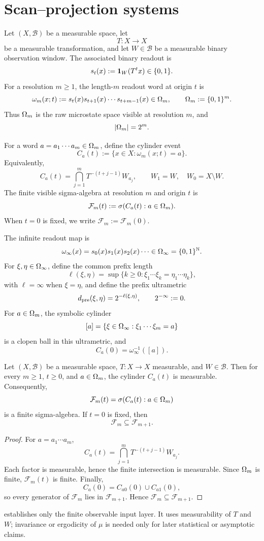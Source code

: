 \section{Scan--projection systems}
\label{sec:scan-projection}

Let \((X,\mathcal B)\) be a measurable space, let
\[
T:X\to X
\]
be a measurable transformation, and let \(W\in\mathcal B\) be a measurable binary observation window.  The associated binary readout is
\[
s_t(x):=\mathbf{1}_W(T^t x)\in\{0,1\}.
\]
For a resolution \(m\ge1\), the length-\(m\) readout word at origin \(t\) is
\[
\omega_m(x;t):=
s_t(x)s_{t+1}(x)\cdots s_{t+m-1}(x)\in\Omega_m,
\qquad
\Omega_m:=\{0,1\}^m.
\]
Thus \(\Omega_m\) is the raw microstate space visible at resolution \(m\), and
\[
|\Omega_m|=2^m.
\]

For a word \(a=a_1\cdots a_m\in\Omega_m\), define the cylinder event
\[
C_a(t):=\{x\in X:\omega_m(x;t)=a\}.
\]
Equivalently,
\[
C_a(t)=\bigcap_{j=1}^{m}T^{-(t+j-1)}W_{a_j},
\qquad
W_1=W,\quad W_0=X\setminus W.
\]
The finite visible sigma-algebra at resolution \(m\) and origin \(t\) is
\[
\mathcal F_m(t):=\sigma(C_a(t):a\in\Omega_m).
\]
When \(t=0\) is fixed, we write \(\mathcal F_m:=\mathcal F_m(0)\).

The infinite readout map is
\[
\omega_\infty(x)=s_0(x)s_1(x)s_2(x)\cdots\in\Omega_\infty=\{0,1\}^{\mathbb{N}}.
\]
For \(\xi,\eta\in\Omega_\infty\), define the common prefix length
\[
\ell(\xi,\eta)=\sup\{k\ge0:\xi_1\cdots\xi_k=\eta_1\cdots\eta_k\},
\]
with \(\ell=\infty\) when \(\xi=\eta\), and define the prefix ultrametric
\[
d_{\rm pre}(\xi,\eta)=2^{-\ell(\xi,\eta)},
\qquad 2^{-\infty}:=0.
\]
For \(a\in\Omega_m\), the symbolic cylinder
\[
[a]=\{\xi\in\Omega_\infty:\xi_1\cdots\xi_m=a\}
\]
is a clopen ball in this ultrametric, and
\[
C_a(0)=\omega_\infty^{-1}([a]).
\]

\begin{theorem}
\label{thm:scan-projection-interface}
Let \((X,\mathcal B)\) be a measurable space, \(T:X\to X\) measurable, and \(W\in\mathcal B\).  Then for every \(m\ge1\), \(t\ge0\), and \(a\in\Omega_m\), the cylinder \(C_a(t)\) is measurable.  Consequently,
\[
\mathcal F_m(t)=\sigma(C_a(t):a\in\Omega_m)
\]
is a finite sigma-algebra.  If \(t=0\) is fixed, then
\[
\mathcal F_m\subseteq\mathcal F_{m+1}.
\]
\end{theorem}

\begin{proof}
For \(a=a_1\cdots a_m\),
\[
C_a(t)=\bigcap_{j=1}^{m}T^{-(t+j-1)}W_{a_j}.
\]
Each factor is measurable, hence the finite intersection is measurable.  Since \(\Omega_m\) is finite, \(\mathcal F_m(t)\) is finite.  Finally,
\[
C_a(0)=C_{a0}(0)\cup C_{a1}(0),
\]
so every generator of \(\mathcal F_m\) lies in \(\mathcal F_{m+1}\).  Hence \(\mathcal F_m\subseteq\mathcal F_{m+1}\).
\end{proof}

\begin{remark}
 establishes only the finite observable input layer.  It uses measurability of \(T\) and \(W\); invariance or ergodicity of \(\mu\) is needed only for later statistical or asymptotic claims.
\end{remark}
